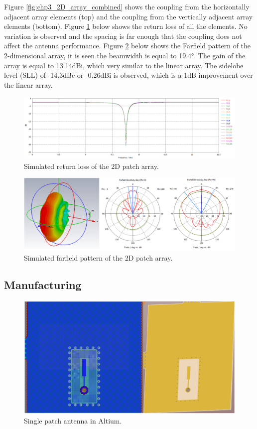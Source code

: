 Figure \ref{fig:chp3_2D_array_combined} shows the coupling from the horizontally adjacent array elements (top) and the coupling from the vertically adjacent array elements (bottom). Figure \ref{fig:chp3_2D_array_S11} below shows the return loss of all the elements. No variation is observed and the spacing is far enough that the coupling does not affect the antenna performance. Figure \ref{fig:chp3_2D_array_pattern} below shows the Farfield pattern of the 2-dimensional array, it is seen the beamwidth is equal to 19.4°. The gain of the array is equal to 13.14dBi, which very similar to the linear array. The sidelobe level (SLL) of -14.3dBc or -0.26dBi is observed, which is a 1dB improvement over the linear array.

    \begin{figure}[H]
    \centering
    \includegraphics[width=0.99\linewidth]{Figures/chp3_2D_array_S11.png}
    \caption{Simulated return loss of the 2D patch array.}
    \label{fig:chp3_2D_array_S11}
    \end{figure}

    \begin{figure}[H]
    \centering
    \includegraphics[width=0.7\linewidth]{Figures/chp3_2D_array_pattern.png}
    \caption{Simulated farfield pattern of the 2D patch array.}
    \label{fig:chp3_2D_array_pattern}
    \end{figure}

\subsection{Manufacturing}

    \begin{figure}[H]
    \centering
    \includegraphics[width=0.5\linewidth]{Figures/chp3_Altium_single.png}
    \caption{Single patch antenna in Altium.}
    \label{fig:chp3_Altium_single}
    \end{figure}

